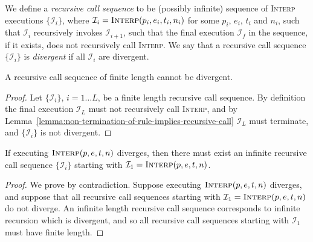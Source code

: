 We define a \textit{recursive call sequence}
    to be (possibly infinite) sequence of \textsc{Interp} executions 
    $\{\mathcal{I}_i\}$,
    where  $\mathcal{I}_i = \textsc{Interp}(p_i, e_i, t_i, n_i)$
    for some $p_i$, $e_i$, $t_i$ and $n_i$,
    such that $\mathcal{I}_i$ recursively invokes $\mathcal{I}_{i+1}$,
    such that the final execution $\mathcal{I}_f$ in the sequence,
    if it exists,
    does not recursively call \textsc{Interp}.
We say that a recursive call sequence $\{\mathcal{I}_i\}$ is
    \textit{divergent} if all $\mathcal{I}_i$ are divergent.
\begin{lemma}
    \label{lemma:non-termination-implies-infinite-recursion}
    A recursive call sequence of finite length cannot be divergent.
\end{lemma}
\begin{proof}
Let $\{\mathcal{I}_i\}$, $i = 1\ldots L$, be a finite length
    recursive call sequence.
By definition the final execution $\mathcal{I}_L$
    must not recursively call \textsc{Interp},
    and by Lemma~\ref{lemma:non-termination-of-rule-implies-recursive-call}
    $\mathcal{I}_L$ must terminate,
    and $\{\mathcal{I}_i\}$ is not divergent.
\end{proof}

\begin{lemma}
    If executing $\textsc{Interp}(p, e, t, n)$ diverges,
    then there must exist an infinite recursive call sequence
    $\{\mathcal{I}_i\}$ 
    starting with $\mathcal{I}_1 = \textsc{Interp}(p, e, t, n)$.
\end{lemma}
\begin{proof}
We prove by contradiction.
Suppose executing $\textsc{Interp}(p, e, t, n)$ diverges,
    and suppose that all recursive call sequences
    starting with $\mathcal{I}_1 = \textsc{Interp}(p, e, t, n)$ do
    not diverge.
An infinite length recursive
    call sequence corresponds to
    infinite recursion which is divergent,
    and so all recursive
    call sequences starting with $\mathcal{I}_1$
    must have finite length.

\end{proof}


